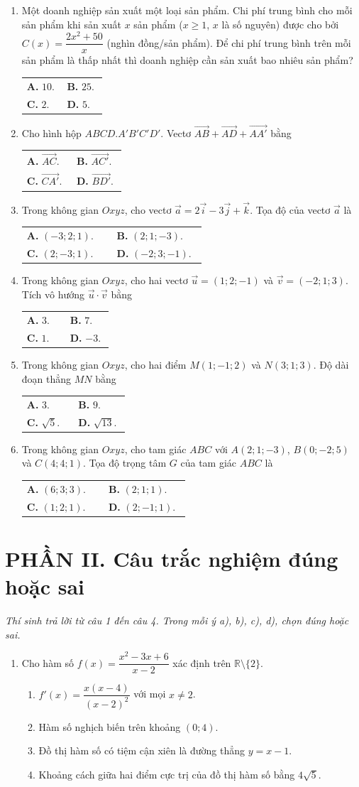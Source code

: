 \documentclass[12pt,a4paper]{article}
\makeatletter
\newcommand{\bonpa}[4]{\par\nobreak\smallskip\nobreak\noindent
\begin{tabular}{@{}p{0.47\linewidth}p{0.47\linewidth}@{}}
\textbf{A.} #1 & \textbf{B.} #2\\[8pt]
\textbf{C.} #3 & \textbf{D.} #4\end{tabular}}
\makeatother
\begin{document}
\newpage
\begin{enumerate}[start=7]
\item Một doanh nghiệp sản xuất một loại sản phẩm. Chi phí trung bình cho mỗi sản phẩm khi sản xuất $x$ sản phẩm ($x\ge1$, $x$ là số nguyên) được cho bởi $C(x)=\dfrac{2x^2+50}{x}$ (nghìn đồng/sản phẩm). Để chi phí trung bình trên mỗi sản phẩm là thấp nhất thì doanh nghiệp cần sản xuất bao nhiêu sản phẩm?
\bonpa{$10$.}{$25$.}{$2$.}{$5$.}

\item Cho hình hộp $ABCD.A'B'C'D'$. Vectơ $\overrightarrow{AB}+\overrightarrow{AD}+\overrightarrow{AA'}$ bằng
\bonpa{$\overrightarrow{AC}$.}{$\overrightarrow{AC'}$.}{$\overrightarrow{CA'}$.}{$\overrightarrow{BD'}$.}

\item Trong không gian $Oxyz$, cho vectơ $\vec a=2\vec i-3\vec j+\vec k$. Tọa độ của vectơ $\vec a$ là
\bonpa{$(-3;2;1)$.}{$(2;1;-3)$.}{$(2;-3;1)$.}{$(-2;3;-1)$.}

\item Trong không gian $Oxyz$, cho hai vectơ $\vec u=(1;2;-1)$ và $\vec v=(-2;1;3)$. Tích vô hướng $\vec u\cdot\vec v$ bằng
\bonpa{$3$.}{$7$.}{$1$.}{$-3$.}

\item Trong không gian $Oxyz$, cho hai điểm $M(1;-1;2)$ và $N(3;1;3)$. Độ dài đoạn thẳng $MN$ bằng
\bonpa{$3$.}{$9$.}{$\sqrt5$.}{$\sqrt{13}$.}

\item Trong không gian $Oxyz$, cho tam giác $ABC$ với $A(2;1;-3)$, $B(0;-2;5)$ và $C(4;4;1)$. Tọa độ trọng tâm $G$ của tam giác $ABC$ là
\bonpa{$(6;3;3)$.}{$(2;1;1)$.}{$(1;2;1)$.}{$(2;-1;1)$.}
\end{enumerate}

\section*{\large PHẦN II. Câu trắc nghiệm đúng hoặc sai}
\textit{Thí sinh trả lời từ câu 1 đến câu 4. Trong mỗi ý a), b), c), d), chọn đúng hoặc sai.}
\begin{enumerate}
\item Cho hàm số $f(x)=\dfrac{x^2-3x+6}{x-2}$ xác định trên $\mathbb R\setminus\{2\}$.
\begin{enumerate}
\item $f'(x)=\dfrac{x(x-4)}{(x-2)^2}$ với mọi $x\ne2$.
\item Hàm số nghịch biến trên khoảng $(0;4)$.
\item Đồ thị hàm số có tiệm cận xiên là đường thẳng $y=x-1$.
\item Khoảng cách giữa hai điểm cực trị của đồ thị hàm số bằng $4\sqrt5$.
\end{enumerate}
\end{enumerate}
\end{document}
